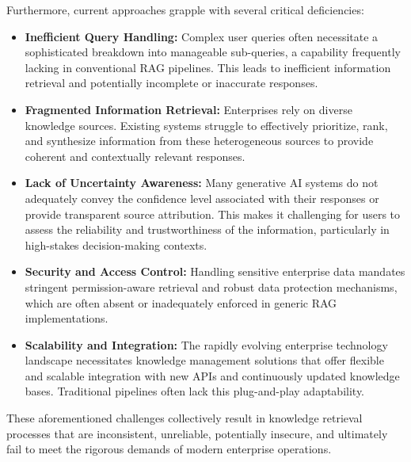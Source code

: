 \documentclass[default]{sn-jnl}%
\begin{document}
Furthermore, current approaches grapple with several critical deficiencies:
\begin{itemize}
    \item \textbf{Inefficient Query Handling:} Complex user queries often necessitate a sophisticated breakdown into manageable sub-queries, a capability frequently lacking in conventional RAG pipelines. This leads to inefficient information retrieval and potentially incomplete or inaccurate responses.
    \item \textbf{Fragmented Information Retrieval:} Enterprises rely on diverse knowledge sources. Existing systems struggle to effectively prioritize, rank, and synthesize information from these heterogeneous sources to provide coherent and contextually relevant responses.
    \item \textbf{Lack of Uncertainty Awareness:} Many generative AI systems do not adequately convey the confidence level associated with their responses or provide transparent source attribution. This makes it challenging for users to assess the reliability and trustworthiness of the information, particularly in high-stakes decision-making contexts.
    \item \textbf{Security and Access Control:} Handling sensitive enterprise data mandates stringent permission-aware retrieval and robust data protection mechanisms, which are often absent or inadequately enforced in generic RAG implementations.
    \item \textbf{Scalability and Integration:} The rapidly evolving enterprise technology landscape necessitates knowledge management solutions that offer flexible and scalable integration with new APIs and continuously updated knowledge bases. Traditional pipelines often lack this plug-and-play adaptability.
\end{itemize}

These aforementioned challenges collectively result in knowledge retrieval processes that are inconsistent, unreliable, potentially insecure, and ultimately fail to meet the rigorous demands of modern enterprise operations.
\end{document}
